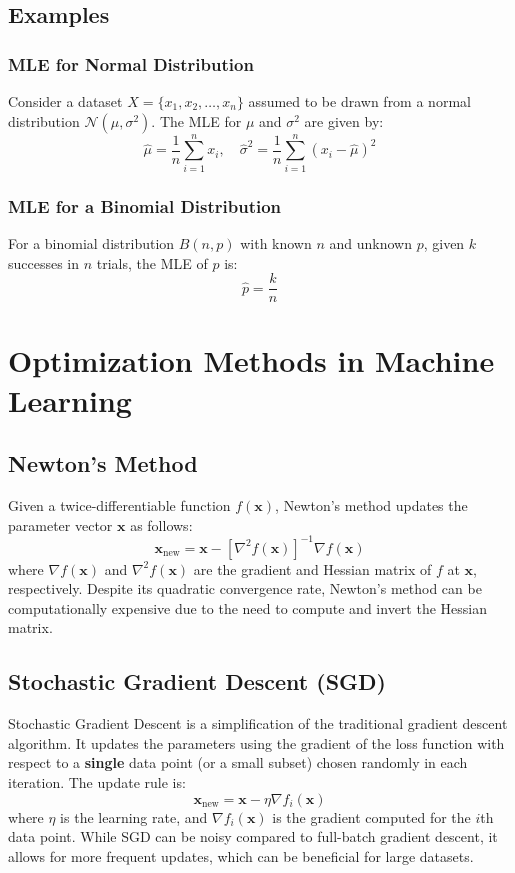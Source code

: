 \documentclass[8pt, a4paper, landscape, includeheadfoot]{extarticle}
\begin{document}
\begin{multicols*}{4}
	\subsection{Examples}
	\subsubsection{MLE for Normal Distribution}{}
	Consider a dataset \( X = \{ x_1, x_2, \ldots, x_n \} \) assumed to be drawn from a normal distribution \(\mathcal{N}(\mu, \sigma^2)\). The MLE for \(\mu\) and \(\sigma^2\) are given by:
	\[
		\hat{\mu} = \frac{1}{n} \sum_{i=1}^{n} x_i, \quad \hat{\sigma}^2 = \frac{1}{n} \sum_{i=1}^{n} (x_i - \hat{\mu})^2
	\]

	\subsubsection{MLE for a Binomial Distribution}{}
	For a binomial distribution \(B(n, p)\) with known \(n\) and unknown \(p\), given \(k\) successes in \(n\) trials, the MLE of \(p\) is:
	\[
		\hat{p} = \frac{k}{n}
	\]


	\section{Optimization Methods in Machine Learning}

	\subsection{Newton's Method}
	Given a twice-differentiable function \(f(\mathbf{x})\), Newton's method updates the parameter vector \(\mathbf{x}\) as follows:
	\[
		\mathbf{x}_{\text{new}} = \mathbf{x} - \left[\nabla^2 f(\mathbf{x})\right]^{-1} \nabla f(\mathbf{x})
	\]
	where \(\nabla f(\mathbf{x})\) and \(\nabla^2 f(\mathbf{x})\) are the gradient and Hessian matrix of \(f\) at \(\mathbf{x}\), respectively. Despite its quadratic convergence rate, Newton's method can be computationally expensive due to the need to compute and invert the Hessian matrix.

	\subsection{Stochastic Gradient Descent (SGD)}
	Stochastic Gradient Descent is a simplification of the traditional gradient descent algorithm. It updates the parameters using the gradient of the loss function with respect to a \textbf{single} data point (or a small subset) chosen randomly in each iteration. The update rule is:
	\[
		\mathbf{x}_{\text{new}} = \mathbf{x} - \eta \nabla f_i(\mathbf{x})
	\]
	where \(\eta\) is the learning rate, and \(\nabla f_i(\mathbf{x})\) is the gradient computed for the \(i\)th data point. While SGD can be noisy compared to full-batch gradient descent, it allows for more frequent updates, which can be beneficial for large datasets.


\end{multicols*}
\end{document}
